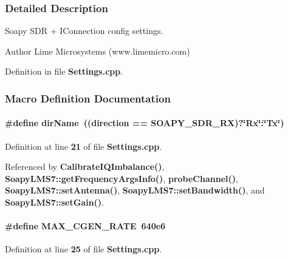 \subsubsection{Detailed Description}
Soapy S\+DR + I\+Connection config settings. 

\begin{DoxyAuthor}{Author}
Lime Microsystems (www.\+limemicro.\+com) 
\end{DoxyAuthor}


Definition in file {\bf Settings.\+cpp}.



\subsubsection{Macro Definition Documentation}
\paragraph[{dir\+Name}]{\setlength{\rightskip}{0pt plus 5cm}\#define dir\+Name~((direction == {\bf S\+O\+A\+P\+Y\+\_\+\+S\+D\+R\+\_\+\+RX})?\char`\"{}Rx\char`\"{}\+:\char`\"{}Tx\char`\"{})}\label{Settings_8cpp_a58306ca9bc3aabe786013c42fc5ff9ba}


Definition at line {\bf 21} of file {\bf Settings.\+cpp}.



Referenced by {\bf Calibrate\+I\+Q\+Imbalance()}, {\bf Soapy\+L\+M\+S7\+::get\+Frequency\+Args\+Info()}, {\bf probe\+Channel()}, {\bf Soapy\+L\+M\+S7\+::set\+Antenna()}, {\bf Soapy\+L\+M\+S7\+::set\+Bandwidth()}, and {\bf Soapy\+L\+M\+S7\+::set\+Gain()}.

\paragraph[{M\+A\+X\+\_\+\+C\+G\+E\+N\+\_\+\+R\+A\+TE}]{\setlength{\rightskip}{0pt plus 5cm}\#define M\+A\+X\+\_\+\+C\+G\+E\+N\+\_\+\+R\+A\+TE~640e6}\label{Settings_8cpp_a2a423988d080ce0e61bd0fec3ea18e23}


Definition at line {\bf 25} of file {\bf Settings.\+cpp}.



